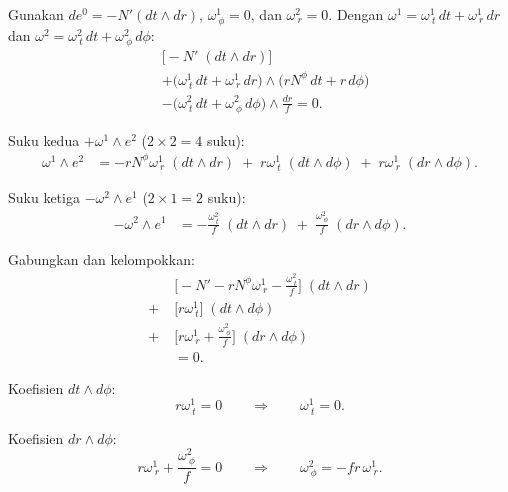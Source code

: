Gunakan $de^0 = -N'(dt \wedge dr)$, $\omega^1_{\ \phi} = 0$, dan $\omega^2_{\ r} = 0$. Dengan $\omega^1 = \omega^1_{\ t}\,dt + \omega^1_{\ r}\,dr$ dan $\omega^2 = \omega^2_{\ t}\,dt + \omega^2_{\ \phi}\,d\phi$:
\begin{align}
    &\Big[-N'\;(dt \wedge dr)\Big] \nonumber\\[6pt]
    &+ \Big(\omega^1_{\ t}\,dt + \omega^1_{\ r}\,dr\Big) \wedge \Big(rN^\phi\,dt + r\,d\phi\Big) \nonumber\\[6pt]
    &- \Big(\omega^2_{\ t}\,dt + \omega^2_{\ \phi}\,d\phi\Big) \wedge \frac{dr}{f} = 0. \label{b42-eq:T0-substituted}
\end{align}
 
Suku kedua $+\omega^1 \wedge e^2$ ($2 \times 2 = 4$ suku):
\begin{align}
    \omega^1 \wedge e^2 &= -rN^\phi\omega^1_{\ r}\;(dt \wedge dr) \;+\; r\omega^1_{\ t}\;(dt \wedge d\phi) \;+\; r\omega^1_{\ r}\;(dr \wedge d\phi). \label{b42-eq:T0-prod2}
\end{align}
 
Suku ketiga $-\omega^2 \wedge e^1$ ($2 \times 1 = 2$ suku):
\begin{align}
    -\omega^2 \wedge e^1 &= -\frac{\omega^2_{\ t}}{f}\;(dt \wedge dr) \;+\; \frac{\omega^2_{\ \phi}}{f}\;(dr \wedge d\phi). \label{b42-eq:T0-prod3}
\end{align}
 
Gabungkan dan kelompokkan:
\begin{align}
    &\Big[-N' - rN^\phi\omega^1_{\ r} - \frac{\omega^2_{\ t}}{f}\Big]\;(dt \wedge dr) \nonumber\\[6pt]
    +\;&\Big[r\omega^1_{\ t}\Big]\;(dt \wedge d\phi) \nonumber\\[6pt]
    +\;&\Big[r\omega^1_{\ r} + \frac{\omega^2_{\ \phi}}{f}\Big]\;(dr \wedge d\phi) \nonumber\\[6pt]
    &= 0. \label{b42-eq:T0-grouped}
\end{align}
 
\noindent Koefisien $dt \wedge d\phi$:
\begin{equation}
    r\omega^1_{\ t} = 0 \qquad \Longrightarrow \qquad \omega^1_{\ t} = 0. \label{b42-eq:res-w1t}
\end{equation}
 
\noindent Koefisien $dr \wedge d\phi$:
\begin{equation}
    r\omega^1_{\ r} + \frac{\omega^2_{\ \phi}}{f} = 0 \qquad \Longrightarrow \qquad \omega^2_{\ \phi} = -fr\,\omega^1_{\ r}. \label{b42-eq:w2phi-rel}
\end{equation}
 
